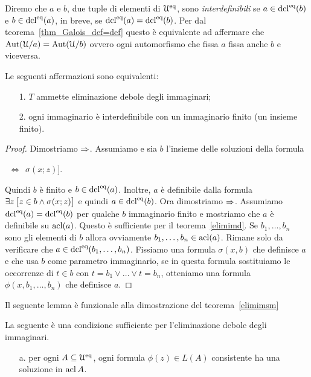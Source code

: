 Diremo che $a$ e $b$, due tuple di elementi di $\EuScript U^{\rm eq}$, sono \emph{interdefinibili\/} se $a\in\mathop{\rm dcl}^{\rm eq}(b)$ e $b\in\mathop{\rm dcl}^{\rm eq}(a)$, in breve, se $\mathop{\rm dcl}^{\rm eq}(a)=\mathop{\rm dcl}^{\rm eq}(b)$. Per dal teorema~\ref{thm_Galois_def=def} questo \`e equivalente ad affermare che $\textrm{Aut}(\EuScript U/a)=\textrm{Aut}(\EuScript U/b)$ ovvero ogni automorfismo che fissa $a$ fissa anche $b$ e viceversa.

\begin{theorem}\label{elimimd2} 
Le seguenti affermazioni sono equivalenti:
\begin{itemize}
\item[1.] $T$ ammette eliminazione debole degli immaginari;
\item[2.] ogni immaginario \`e interdefinibile con un immaginario finito (un insieme finito).
\end{itemize}
\end{theorem}

\begin{proof}
Dimostriamo $\Rightarrow$. Assumiamo  e sia $b$ l'insieme delle soluzioni della formula

\hspace*{30ex}\llap{$\A x\ \Big[x\in a$}$\ \  \iff\ \  \sigma(x;z)\Big]$.

Quindi $b$ \`e finito e $b\in\mathop{\rm dcl}^{\rm eq}(a)$. Inoltre, $a$ \`e definibile dalla formula $\exists z\,\big[z\in b\wedge \sigma(x;z)\big]$ e quindi $a\in\mathop{\rm dcl}^{\rm eq}(b)$. Ora dimostriamo $\Rightarrow$. Assumiamo $\mathop{\rm dcl}^{\rm eq}(a)=\mathop{\rm dcl}^{\rm eq}(b)$ per qualche $b$ immaginario finito e mostriamo che $a$ \`e definibile su $\mathop{\rm acl}(a)$. Questo \`e sufficiente per il teorema~\ref{elimimd}. Se $b_1,\dots,b_n$ sono gli elementi di $b$ allora ovviamente $b_1,\dots,b_n\in\mathop{\rm acl}(a)$. Rimane solo da verificare che $a\in\mathop{\rm dcl}^{\rm eq}(b_1,\dots,b_n)$. Fissiamo una formula $\sigma(x,b)$ che definisce $a$ e che usa $b$ come parametro immaginario, se in questa formula sostituiamo le occorrenze di $t\in b$ con $t=b_1\vee\dots\vee t=b_n$, otteniamo una formula $\phi(x,b_1,\dots,b_n)$ che definisce $a$.
\end{proof}

Il seguente lemma \`e funzionale alla dimostrazione del teorema~\ref{elimimsm}

\begin{lemma}\label{tvtestimmaginari} 
La seguente \`e una condizione sufficiente per l'eliminazione debole degli immaginari.
\begin{itemize}
\item[a.] per ogni $A\subseteq\EuScript U^{\rm eq}$, ogni formula $\phi(z)\in L(A)$ consistente ha una soluzione in $\mathop{\rm acl} A$.
\end{itemize}
\end{lemma}


